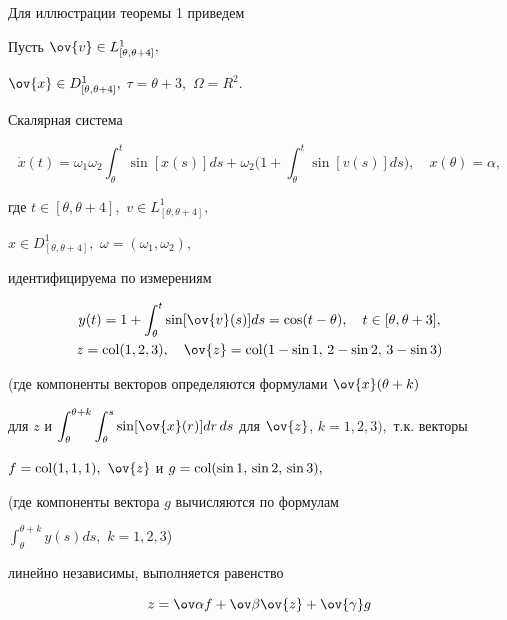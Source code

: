 Для иллюстрации теоремы 1 приведем





\begin{exam}


Пусть $\ov{v}\in L^1_{[\theta,\theta+4]},$


$\ov{x}\in D^1_{[\theta,\theta+4]},$ $\tau=\theta+3,$ $\Omega= R^2.$


Скалярная система


\begin{equation}


\Dot{x}(t) = \omega_1\omega_2\int_{\theta}^t\sin[x(s)]ds +


\omega_2\biggl(1+\int_{\theta}^t \sin [v(s)]ds\biggr),\quad x(\theta)=\alpha,


\end{equation}


где $t\in[\theta,\theta+4],$ $v\in L^1_{[\theta,\theta+4]},$


$x\in D^1_{[\theta,\theta+4]},$ $\omega=(\omega_1,\omega_2),$


идентифицируема по измерениям


\begin{gather*}


y(t) = 1+\int_{\theta}^t \sin [\ov{v}(s)]ds = \cos (t-\theta),\quad


t\in[\theta,\theta+3], \\


z=\col(1, 2, 3),\quad \ov{z}=\col(1-\sin1,\, 2-\sin 2,\, 3- \sin 3)


\end{gather*}


(где компоненты векторов определяются формулами $\ov{x}(\theta+k)$


для $z$ и ${\displaystyle \int_{\theta}^{\theta+k}\int_{\theta}^s


\sin[\ov{x}(r)]dr\,ds}$ для $\ov{z}$, $k= 1, 2, 3),$ т.к. векторы


$f=\operatorname{col}(1,1,1),$ $\ov{z}$ и $g=\operatorname{col}(\sin 1,\, \sin 2,\, \sin 3),$


(где компоненты вектора $g$ вычисляются по формулам


${\displaystyle \int_{\theta}^{\theta+k} y(s)ds,}$ $k=1, 2, 3$)


линейно независимы, выполняется равенство


$$


z = \ov\alpha f + \ov\beta \ov{z} + \ov{\gamma} g


$$



\end{exam}
